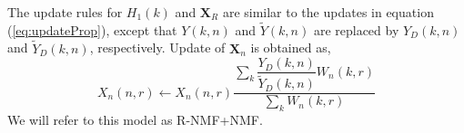 The update rules for $H_1(k)$ and $\mathbf{X}_R$ are similar to the updates in equation (\ref{eq:updateProp}), except that $Y(k,n)$ and $\tilde{Y}(k,n)$ are replaced by $Y_D(k,n)$ and $\tilde{Y}_D(k,n)$, respectively. Update of $\mathbf{X}_n$ is obtained as,
\begin{equation}
X_n(n,r) \leftarrow X_n(n,r) \dfrac{\sum_k \dfrac{Y_D(k,n)}{\tilde{Y}_D(k,n)}W_n(k,r)}{\sum_k W_n(k,r)}
\end{equation}
We will refer to this model as R-NMF+NMF.

